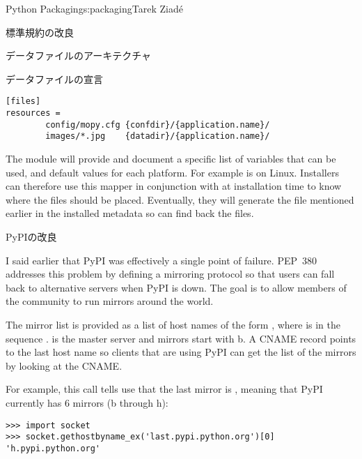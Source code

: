 \begin{aosachapter}{Python Packaging}{s:packaging}{Tarek Ziad\'{e}}
\begin{aosasect1}{標準規約の改良}
\begin{aosasect2}{データファイルのアーキテクチャ}
\begin{aosasect3}{データファイルの宣言}
\begin{verbatim}
[files]
resources =
        config/mopy.cfg {confdir}/{application.name}/
        images/*.jpg    {datadir}/{application.name}/
\end{verbatim}

\noindent
The  module will provide and document a specific list
of variables that can be used, and default values for each platform.
For example  is  on Linux.  Installers can
therefore use this mapper in conjunction with  at
installation time to know where the files should be placed.
Eventually, they will generate the  file mentioned
earlier in the installed metadata so  can find back the
files.


\end{aosasect3}

\end{aosasect2}

\begin{aosasect2}{PyPIの改良}

I said earlier that PyPI was effectively a single point of
failure. PEP~380 addresses this problem by defining a mirroring
protocol so that users can fall back to alternative servers when PyPI
is down. The goal is to allow members of the community to run mirrors
around the world.


The mirror list is provided as a list of host names of the form
, where  is in the sequence
.   is the master
server and mirrors start with b. A CNAME record
 points to the last host name so clients
that are using PyPI can get the list of the mirrors by looking at the
CNAME.

For example, this call tells use that the last mirror is
, meaning that PyPI currently has 6 mirrors (b
through h):

\begin{verbatim}
>>> import socket
>>> socket.gethostbyname_ex('last.pypi.python.org')[0]
'h.pypi.python.org'
\end{verbatim}


\end{aosasect2}
\end{aosasect1}
\end{aosachapter}
